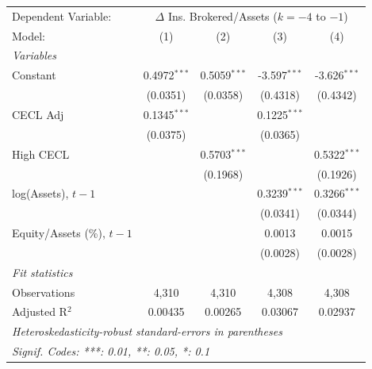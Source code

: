 
\begingroup
\centering
\begin{tabular}{lcccc}
   \tabularnewline \midrule \midrule
   Dependent Variable: & \multicolumn{4}{c}{$\Delta$ Ins. Brokered/Assets ($k{=}{-}4$ to $-1$)}\\
   Model:                       & (1)            & (2)            & (3)            & (4)\\  
   \midrule
   \emph{Variables}\\
   Constant                     & 0.4972$^{***}$ & 0.5059$^{***}$ & -3.597$^{***}$ & -3.626$^{***}$\\   
                                & (0.0351)       & (0.0358)       & (0.4318)       & (0.4342)\\   
   CECL Adj                     & 0.1345$^{***}$ &                & 0.1225$^{***}$ &   \\   
                                & (0.0375)       &                & (0.0365)       &   \\   
   High CECL                    &                & 0.5703$^{***}$ &                & 0.5322$^{***}$\\   
                                &                & (0.1968)       &                & (0.1926)\\   
   log(Assets), $t{-}1$         &                &                & 0.3239$^{***}$ & 0.3266$^{***}$\\   
                                &                &                & (0.0341)       & (0.0344)\\   
   Equity/Assets (\%), $t{-}1$  &                &                & 0.0013         & 0.0015\\   
                                &                &                & (0.0028)       & (0.0028)\\   
   \midrule
   \emph{Fit statistics}\\
   Observations                 & 4,310          & 4,310          & 4,308          & 4,308\\  
   Adjusted R$^2$               & 0.00435        & 0.00265        & 0.03067        & 0.02937\\  
   \midrule \midrule
   \multicolumn{5}{l}{\emph{Heteroskedasticity-robust standard-errors in parentheses}}\\
   \multicolumn{5}{l}{\emph{Signif. Codes: ***: 0.01, **: 0.05, *: 0.1}}\\
\end{tabular}
\par\endgroup


